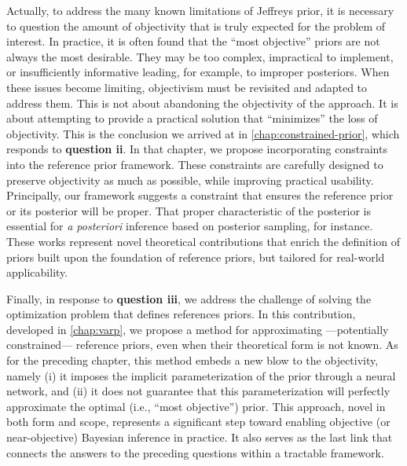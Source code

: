 Actually, to address the many known limitations of Jeffreys prior, it is necessary to question the amount of objectivity that is truly expected for the problem of interest. %
In practice, it is often found that the ``most objective'' priors are not always the most desirable. They may be too complex, impractical to implement, or insufficiently informative leading, for example, to improper posteriors. 
When these issues become limiting, objectivism must be revisited and adapted to address them. This is not about abandoning the objectivity of the approach. It is about attempting to provide a practical solution that ``minimizes'' the loss of objectivity.
%
%
This is the conclusion we arrived at in \cref{chap:constrained-prior}, which responds to \textbf{question ii}.
In that chapter, we propose incorporating constraints into the reference prior framework. These constraints are carefully designed to preserve objectivity as much as possible, while improving practical usability. 
Principally, our framework suggests a constraint that ensures the reference prior or its posterior will be proper. That proper characteristic of the posterior is essential for \emph{a posteriori} inference based on posterior sampling, for instance.
These works represent novel theoretical contributions that enrich the definition of priors built upon the foundation of reference priors, but tailored for real-world applicability.

Finally, in response to \textbf{question iii}, we address the challenge of solving the optimization problem that defines references priors. %
In this contribution, developed in \cref{chap:varp}, we propose a method for approximating ---potentially constrained--- reference priors, even when their theoretical form is not known. As for the preceding chapter, this method embeds a new blow to the objectivity, namely (i) it imposes the implicit parameterization of the prior through a neural network, and (ii) it does not guarantee that this parameterization will perfectly approximate the optimal (i.e., ``most objective'') prior. %
This approach, novel in both form and scope, represents a significant step toward enabling objective (or near-objective) Bayesian inference in practice. It also serves as the last link that connects the answers to the preceding questions within a tractable framework.

